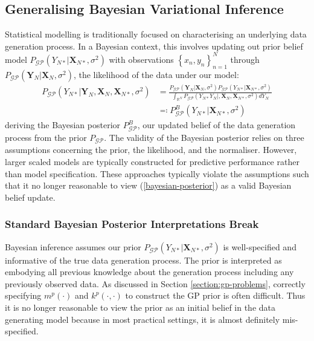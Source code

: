 \documentclass{article}
\newcommand{\GP}{\operatorname{\mathcal{GP}}}
\numberwithin{equation}{section}
\begin{document}
\subsection{Generalising Bayesian Variational Inference}
Statistical modelling is traditionally focused on characterising an underlying data generation process. In a Bayesian context, this involves updating out prior belief model $P_{\GP}\left(Y_{N*}\vert \mathbf{X}_{N*}, \sigma^2\right)$ with observations $\left\{x_n, y_n\right\}_{n=1}^N$ through $P_{\GP}\left(\mathbf{Y}_N|\mathbf{X}_N, \sigma^2\right)$, the likelihood of the data under our model:
\begin{align}
\label{bayesian-posterior}
P_{\GP}\left(Y_{N*} \vert \mathbf{Y}_N, \mathbf{X}_N, \mathbf{X}_{N*}, \sigma^2 \right) &= \frac{P_{\GP}\left(\mathbf{Y}_N|\mathbf{X}_N, \sigma^2\right)P_{\GP}\left(Y_{N*}\vert \mathbf{X}_{N*}, \sigma^2\right)}{\int_{\mathbb{R}^{N}} P_{\GP}\left(Y_{N*} Y_N  \vert, \mathbf{X}_N, \mathbf{X}_{N*}, \sigma^2 \right) d Y_{N}} \\
\label{bayesian-posterior-definition}
&\eqqcolon P_{\GP}^B \left(Y_{N*} \vert\mathbf{X}_{N*}, \sigma^2 \right)
\end{align}
deriving the Bayesian posterior $P_{\GP}^B$, our updated belief of the data generation process from the prior $P_{\GP}$. The validity of the Bayesian posterior relies on three assumptions concerning the prior, the likelihood, and the normaliser. However, larger scaled models are typically constructed for predictive performance rather than model specification. These approaches typically violate the assumptions such that it no longer reasonable to view (\ref{bayesian-posterior}) as a valid Bayesian belief update.

\subsubsection{Standard Bayesian Posterior Interpretations Break}
Bayesian inference assumes our prior $P_{\GP}\left(Y_{N*}\vert \mathbf{X}_{N*}, \sigma^2\right)$ is well-specified and informative of the true data generation process. The prior is interpreted as embodying all previous knowledge about the generation process including any previously observed data. As discussed in Section \ref{section:gp-problems}, correctly specifying $m^p(\cdot)$ and $k^p(\cdot, \cdot)$ to construct the GP prior is often difficult. Thus it is no longer reasonable to view the prior as an initial belief in the data generating model because in most practical settings, it is almost definitely mis-specified.
\end{document}

